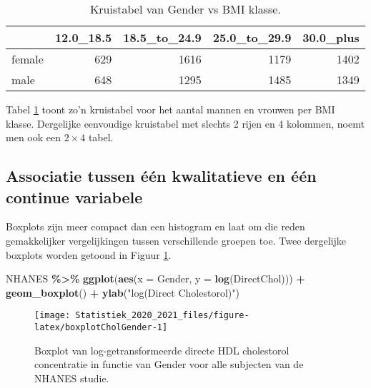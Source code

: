 \documentclass[
  12pt,dutch,coursenotes]{book}
\newenvironment{Shaded}{\begin{snugshade}}{\end{snugshade}}
\newcommand{\DataTypeTok}[1]{\textcolor[rgb]{0.13,0.29,0.53}{#1}}
\newcommand{\KeywordTok}[1]{\textcolor[rgb]{0.13,0.29,0.53}{\textbf{#1}}}
\newcommand{\NormalTok}[1]{#1}
\newcommand{\OperatorTok}[1]{\textcolor[rgb]{0.81,0.36,0.00}{\textbf{#1}}}
\newcommand{\StringTok}[1]{\textcolor[rgb]{0.31,0.60,0.02}{#1}}
\theoremstyle{definition}
\theoremstyle{definition}
\theoremstyle{definition}
\theoremstyle{remark}
\begin{document}
\begin{table}

\caption{\label{tab:genderBMI}Kruistabel van Gender vs BMI klasse.}
\centering
\begin{tabular}[t]{lrrrr}
\toprule
  & 12.0\_18.5 & 18.5\_to\_24.9 & 25.0\_to\_29.9 & 30.0\_plus\\
\midrule
female & 629 & 1616 & 1179 & 1402\\
male & 648 & 1295 & 1485 & 1349\\
\bottomrule
\end{tabular}
\end{table}

Tabel \ref{tab:genderBMI} toont zo'n kruistabel voor het aantal mannen en vrouwen per BMI klasse. Dergelijke eenvoudige kruistabel met slechts 2 rijen en 4 kolommen, noemt men ook een \(2\times 4\) tabel.

\hypertarget{subsec:asskwalcont}{%
\subsection{Associatie tussen één kwalitatieve en één continue variabele}\label{subsec:asskwalcont}}

Boxplots zijn meer compact dan een histogram en laat om die reden gemakkelijker vergelijkingen tussen verschillende groepen toe. Twee dergelijke boxplots
worden getoond in Figuur \ref{fig:boxplotCholGender}.

\begin{Shaded}
\begin{Highlighting}[]
\NormalTok{NHANES }\OperatorTok{\%\textgreater{}\%}\StringTok{ }\KeywordTok{ggplot}\NormalTok{(}\KeywordTok{aes}\NormalTok{(}\DataTypeTok{x =}\NormalTok{ Gender, }\DataTypeTok{y =} \KeywordTok{log}\NormalTok{(DirectChol))) }\OperatorTok{+}\StringTok{ }
\StringTok{    }\KeywordTok{geom\_boxplot}\NormalTok{() }\OperatorTok{+}\StringTok{ }\KeywordTok{ylab}\NormalTok{(}\StringTok{"log(Direct Cholestorol)"}\NormalTok{)}
\end{Highlighting}
\end{Shaded}

\begin{figure}

{\centering \texttt{[image: Statistiek\_2020\_2021\_files/figure-latex/boxplotCholGender-1]} 

}

\caption{Boxplot van log-getransformeerde directe HDL cholestorol concentratie in functie van Gender voor alle subjecten van de NHANES studie.}\label{fig:boxplotCholGender}
\end{figure}
\end{document}
